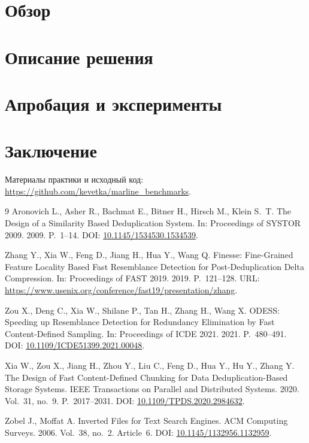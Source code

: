 \documentclass[a4paper]{article}
\begin{document}
\section{Обзор}

\section{Описание решения}

\section{Апробация и эксперименты}

\section{Заключение}

Материалы практики и исходный код: \url{https://github.com/kevetka/marline_benchmarks}.

\begin{thebibliography}{9}
    Aronovich L., Asher R., Bachmat E., Bitner H., Hirsch M., Klein S.~T.
    \newblock The Design of a Similarity Based Deduplication System.
    \newblock In: Proceedings of SYSTOR 2009. 2009. P.~1--14.
    \newblock DOI: \href{https://doi.org/10.1145/1534530.1534539}{10.1145/1534530.1534539}.

    Zhang Y., Xia W., Feng D., Jiang H., Hua Y., Wang Q.
    \newblock Finesse: Fine-Grained Feature Locality Based Fast Resemblance Detection for Post-Deduplication Delta Compression.
    \newblock In: Proceedings of FAST 2019. 2019. P.~121--128.
    \newblock URL: \url{https://www.usenix.org/conference/fast19/presentation/zhang}.

    Zou X., Deng C., Xia W., Shilane P., Tan H., Zhang H., Wang X.
    \newblock ODESS: Speeding up Resemblance Detection for Redundancy Elimination by Fast Content-Defined Sampling.
    \newblock In: Proceedings of ICDE 2021. 2021. P.~480--491.
    \newblock DOI: \href{https://doi.org/10.1109/ICDE51399.2021.00048}{10.1109/ICDE51399.2021.00048}.

    Xia W., Zou X., Jiang H., Zhou Y., Liu C., Feng D., Hua Y., Hu Y., Zhang Y.
    \newblock The Design of Fast Content-Defined Chunking for Data Deduplication-Based Storage Systems.
    \newblock IEEE Transactions on Parallel and Distributed Systems. 2020. Vol.~31, no.~9. P.~2017--2031.
    \newblock DOI: \href{https://doi.org/10.1109/TPDS.2020.2984632}{10.1109/TPDS.2020.2984632}.

    Zobel J., Moffat A.
    \newblock Inverted Files for Text Search Engines.
    \newblock ACM Computing Surveys. 2006. Vol.~38, no.~2. Article~6.
    \newblock DOI: \href{https://doi.org/10.1145/1132956.1132959}{10.1145/1132956.1132959}.
\end{thebibliography}
\end{document}
